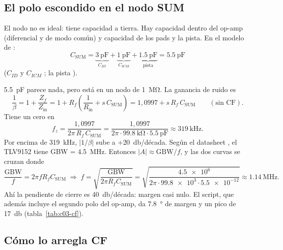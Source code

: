 \subsection{El polo escondido en el nodo SUM}

El nodo  no es ideal: tiene capacidad a tierra. Hay capacidad dentro del op-amp (diferencial y de modo común)
y capacidad de los pads y la pista. En el modelo de :
\begin{equation*}
  C_{\mathrm{SUM}} = \underbrace{\SI{3}{\pico\farad}}_{C_{ID}} + \underbrace{\SI{1}{\pico\farad}}_{C_{ICM}}
  + \underbrace{\SI{1.5}{\pico\farad}}_{\text{pista}} = \SI{5.5}{\pico\farad}
\end{equation*}
($C_{ID}$ y $C_{ICM}$ ; la pista \estimado).

\SI{5.5}{\pico\farad} parece nada, pero está en un nodo de \SI{1}{\mega\ohm}. La ganancia de ruido es
\begin{equation*}
  \frac{1}{\beta} = 1 + \frac{Z_f}{Z_{\mathrm{in}}} = 1 + R_f\left(\frac{1}{R_{\mathrm{in}}} + s\,C_{\mathrm{SUM}}\right)
  = 1{,}0997 + s\,R_f\,C_{\mathrm{SUM}} \qquad (\text{sin CF}).
\end{equation*}
Tiene un cero en
\begin{equation*}
  f_z = \frac{1{,}0997}{2\pi\,R_f\,C_{\mathrm{SUM}}} = \frac{1{,}0997}{2\pi\cdot\SI{99.8}{\kilo\ohm}\cdot\SI{5.5}{\pico\farad}}
  \approx \SI{319}{\kilo\hertz}.
\end{equation*}
Por encima de \SI{319}{\kilo\hertz}, $|1/\beta|$ sube a $+$\SI{20}{\decibel}/década. Según el datasheet , el
TLV9152 tiene GBW = \SI{4.5}{\mega\hertz}. Entonces $|A| \approx \mathrm{GBW}/f$, y las dos curvas se
cruzan donde
\begin{equation*}
  \frac{\mathrm{GBW}}{f} = 2\pi f R_f C_{\mathrm{SUM}} \;\Rightarrow\;
  f = \sqrt{\frac{\mathrm{GBW}}{2\pi R_f C_{\mathrm{SUM}}}} = \sqrt{\frac{\num{4.5e6}}{2\pi\cdot\num{99.8e3}\cdot\num{5.5e-12}}}
  \approx \SI{1.14}{\mega\hertz}.
\end{equation*}
Ahí la pendiente de cierre es \SI{40}{\decibel}/década: margen casi nulo. El script, que además incluye el segundo
polo del op-amp, da \SI{7.8}{\degree} de margen y un pico de \SI{17}{\decibel} (tabla~\ref{tab:c03-cf}).

\subsection{Cómo lo arregla CF}

